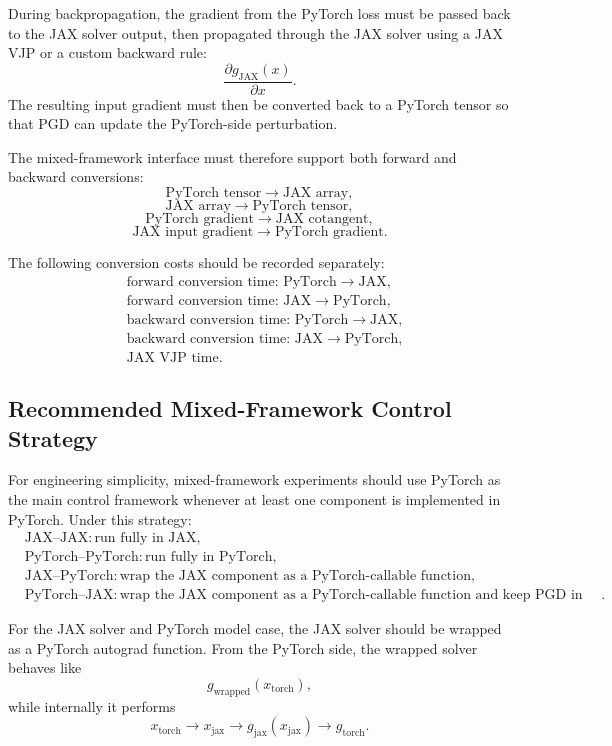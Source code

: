 \documentclass{article}
\begin{document}
During backpropagation, the gradient from the PyTorch loss must be passed back to the JAX solver output, then propagated through the JAX solver using a JAX VJP or a custom backward rule:
\[
\frac{\partial g_{\mathrm{JAX}}(x)}{\partial x}.
\]
The resulting input gradient must then be converted back to a PyTorch tensor so that PGD can update the PyTorch-side perturbation.

The mixed-framework interface must therefore support both forward and backward conversions:
\[
\text{PyTorch tensor} \rightarrow \text{JAX array},
\]
\[
\text{JAX array} \rightarrow \text{PyTorch tensor},
\]
\[
\text{PyTorch gradient} \rightarrow \text{JAX cotangent},
\]
\[
\text{JAX input gradient} \rightarrow \text{PyTorch gradient}.
\]

The following conversion costs should be recorded separately:
\[
\begin{aligned}
&\text{forward conversion time: PyTorch} \rightarrow \text{JAX},\\
&\text{forward conversion time: JAX} \rightarrow \text{PyTorch},\\
&\text{backward conversion time: PyTorch} \rightarrow \text{JAX},\\
&\text{backward conversion time: JAX} \rightarrow \text{PyTorch},\\
&\text{JAX VJP time}.
\end{aligned}
\]

\subsection{Recommended Mixed-Framework Control Strategy}

For engineering simplicity, mixed-framework experiments should use PyTorch as the main control framework whenever at least one component is implemented in PyTorch. Under this strategy:
\[
\begin{aligned}
&\text{JAX--JAX}: \text{run fully in JAX},\\
&\text{PyTorch--PyTorch}: \text{run fully in PyTorch},\\
&\text{JAX--PyTorch}: \text{wrap the JAX component as a PyTorch-callable function},\\
&\text{PyTorch--JAX}: \text{wrap the JAX component as a PyTorch-callable function and keep PGD in PyTorch}.
\end{aligned}
\]

For the JAX solver and PyTorch model case, the JAX solver should be wrapped as a PyTorch autograd function. From the PyTorch side, the wrapped solver behaves like
\[
g_{\mathrm{wrapped}}(x_{\mathrm{torch}}),
\]
while internally it performs
\[
x_{\mathrm{torch}}
\rightarrow
x_{\mathrm{jax}}
\rightarrow
g_{\mathrm{jax}}(x_{\mathrm{jax}})
\rightarrow
g_{\mathrm{torch}}.
\]
\end{document}

